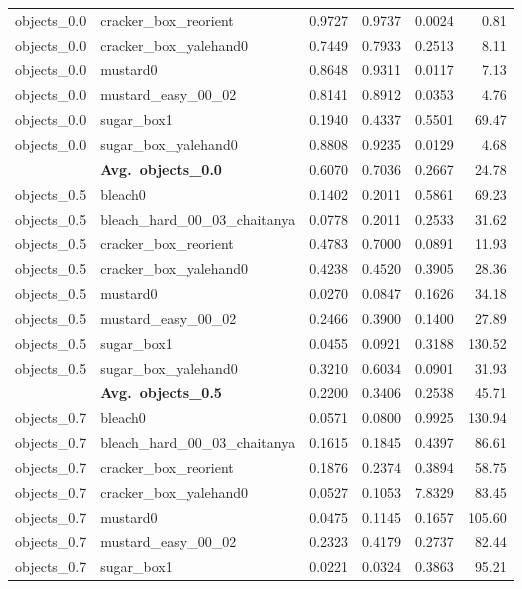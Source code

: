 \begin{longtable}{llrrrr}
  objects_0.0 & cracker\_box\_reorient & 0.9727 & 0.9737 & 0.0024 & 0.81 \\
  objects_0.0 & cracker\_box\_yalehand0 & 0.7449 & 0.7933 & 0.2513 & 8.11 \\
  objects_0.0 & mustard0 & 0.8648 & 0.9311 & 0.0117 & 7.13 \\
  objects_0.0 & mustard\_easy\_00\_02 & 0.8141 & 0.8912 & 0.0353 & 4.76 \\
  objects_0.0 & sugar\_box1 & 0.1940 & 0.4337 & 0.5501 & 69.47 \\
  objects_0.0 & sugar\_box\_yalehand0 & 0.8808 & 0.9235 & 0.0129 & 4.68 \\
  \cmidrule{2-6}
  & \textbf{Avg.~objects_0.0} & 0.6070 & 0.7036 & 0.2667 & 24.78 \\
  \midrule
  objects_0.5 & bleach0 & 0.1402 & 0.2011 & 0.5861 & 69.23 \\
  objects_0.5 & bleach\_hard\_00\_03\_chaitanya & 0.0778 & 0.2011 & 0.2533 & 31.62 \\
  objects_0.5 & cracker\_box\_reorient & 0.4783 & 0.7000 & 0.0891 & 11.93 \\
  objects_0.5 & cracker\_box\_yalehand0 & 0.4238 & 0.4520 & 0.3905 & 28.36 \\
  objects_0.5 & mustard0 & 0.0270 & 0.0847 & 0.1626 & 34.18 \\
  objects_0.5 & mustard\_easy\_00\_02 & 0.2466 & 0.3900 & 0.1400 & 27.89 \\
  objects_0.5 & sugar\_box1 & 0.0455 & 0.0921 & 0.3188 & 130.52 \\
  objects_0.5 & sugar\_box\_yalehand0 & 0.3210 & 0.6034 & 0.0901 & 31.93 \\
  \cmidrule{2-6}
  & \textbf{Avg.~objects_0.5} & 0.2200 & 0.3406 & 0.2538 & 45.71 \\
  \midrule
  objects_0.7 & bleach0 & 0.0571 & 0.0800 & 0.9925 & 130.94 \\
  objects_0.7 & bleach\_hard\_00\_03\_chaitanya & 0.1615 & 0.1845 & 0.4397 & 86.61 \\
  objects_0.7 & cracker\_box\_reorient & 0.1876 & 0.2374 & 0.3894 & 58.75 \\
  objects_0.7 & cracker\_box\_yalehand0 & 0.0527 & 0.1053 & 7.8329 & 83.45 \\
  objects_0.7 & mustard0 & 0.0475 & 0.1145 & 0.1657 & 105.60 \\
  objects_0.7 & mustard\_easy\_00\_02 & 0.2323 & 0.4179 & 0.2737 & 82.44 \\
  objects_0.7 & sugar\_box1 & 0.0221 & 0.0324 & 0.3863 & 95.21 \\

\end{longtable}

